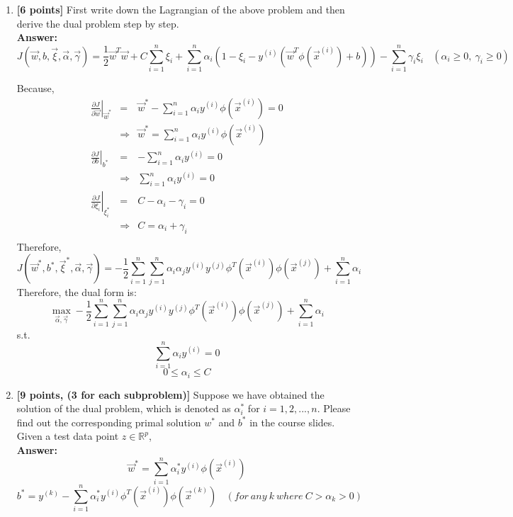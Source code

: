\begin{enumerate}
\item \textbf{[6 points]} First write down the Lagrangian of the above problem and then derive the dual problem step by step.
\\\textbf{Answer:}\\

$$J(\vec{w},b,\vec{\xi},\vec{\alpha},\vec{\gamma}) = \frac{1}{2}\vec{w}^T\vec{w}+C\sum_{i=1}^{n}\xi_i + \sum_{i=1}^{n} \alpha_i(1-\xi_i-y^{(i)}(\vec{w}^T\phi(\vec{x}^{(i)})+b)) - \sum_{i=1}^{n}\gamma_i\xi_i~~~~(\alpha_i\geq0,~\gamma_i\geq0)$$

Because,
\begin{equation}
\nonumber
\begin{array}{rcl}
\left.\frac{\partial J}{\partial \vec{w}}\right|_{\vec{w}^*} & = & \vec{w}^*-\sum_{i=1}^{n}\alpha_iy^{(i)}\phi(\vec{x}^{(i)}) = 0 \\
									& \Rightarrow & \vec{w}^* = \sum_{i=1}^{n}\alpha_iy^{(i)}\phi(\vec{x}^{(i)}) \\

\left.\frac{\partial J}{\partial b}\right|_{b^*} & = & -\sum_{i=1}^{n}\alpha_iy^{(i)} = 0 \\
& \Rightarrow & \sum_{i=1}^{n}\alpha_iy^{(i)} = 0 \\	

\left.\frac{\partial J}{\partial \xi_i}\right|_{\xi_i^*} & = & C-\alpha_i-\gamma_i = 0 \\
& \Rightarrow & C = \alpha_i+\gamma_i \\								
\end{array}
\end{equation}
Therefore,
$$J(\vec{w}^*,b^*,\vec{\xi}^*,\vec{\alpha},\vec{\gamma}) = -\frac{1}{2}\sum_{i=1}^{n}\sum_{j=1}^{n}\alpha_i\alpha_j y^{(i)} y^{(j)} \phi^T(\vec{x}^{(i)})\phi(\vec{x}^{(j)})+\sum_{i=1}^{n}\alpha_i$$
Therefore, the dual form is:
$$\max_{\vec{\alpha},\vec{\gamma}} -\frac{1}{2}\sum_{i=1}^{n}\sum_{j=1}^{n}\alpha_i\alpha_j y^{(i)} y^{(j)} \phi^T(\vec{x}^{(i)})\phi(\vec{x}^{(j)})+\sum_{i=1}^{n}\alpha_i$$
s.t.
$$\sum_{i=1}^{n}\alpha_i y^{(i)} = 0$$
$$0\leq\alpha_i\leq C$$


\item \textbf{[9 points, (3 for each subproblem)]} Suppose we have obtained the solution of the dual problem, which is denoted as $\alpha_i^*$ for $i=1,2,...,n$. Please find out the corresponding primal solution $w^*$ and $b^*$ in the course slides. Given a test data point $z\in \mathbb{R}^p$,
\\\textbf{Answer:}\\
$$\vec{w}^* = \sum_{i=1}^{n}\alpha_i^*y^{(i)}\phi(\vec{x}^{(i)})$$
$$b^* = y^{(k)}-\sum_{i=1}^{n}\alpha_i^*y^{(i)}\phi^T(\vec{x}^{(i)})\phi(\vec{x}^{(k)})~~~~(for~any~k~where~C>\alpha_k>0)$$


\end{enumerate}
